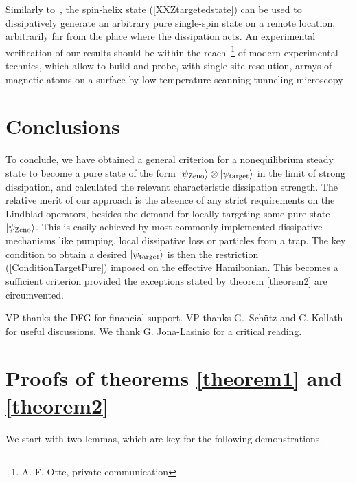 \documentclass[aps,pra,letterpaper,twocolumn,showpacs,superscriptaddress,floatfix,longbibliography]{revtex4-1}
\begin{document}
Similarly to~\cite{2016ZnidarichTargeting}, the spin-helix state
(\ref{XXZtargetedstate}) can be used to dissipatively generate an
arbitrary pure single-spin state on a remote location, arbitrarily far
from the place where the dissipation acts.  An experimental
verification of our results should be within the
reach~\footnote{A. F. Otte, private communication} of modern
experimental technics, which allow to build and probe, with
single-site resolution, arrays of magnetic atoms on a surface by
low-temperature scanning tunneling microscopy~\cite{2016OtteXXZ}.

\section{Conclusions}
To conclude, we have obtained a general criterion for a nonequilibrium
steady state to become a pure state of the form
$|{\psi_\mathrm{Zeno}}\rangle\otimes|{\psi_\mathrm{target}}\rangle$ in the
limit of strong dissipation, and calculated the relevant
characteristic dissipation strength.  The relative merit of our
approach is the absence of any strict requirements on the Lindblad
operators, besides the demand for locally targeting some pure state
$|{\psi_\mathrm{Zeno}}\rangle$. This is easily achieved by most commonly
implemented dissipative mechanisms like pumping, local dissipative
loss or particles from a trap. The key condition to obtain a desired
$|{\psi_\mathrm{target}}\rangle$ is then the restriction
(\ref{ConditionTargetPure}) imposed on the effective Hamiltonian. This
becomes a sufficient criterion provided the exceptions stated by
theorem \ref{theorem2} are circumvented.



\begin{acknowledgments}
  VP thanks the DFG for financial support. VP thanks G.~Sch\"utz and
  C. Kollath for useful discussions. We thank G. Jona-Lasinio for a
  critical reading.
\end{acknowledgments}


\appendix


\section{Proofs of theorems \ref{theorem1} and \ref{theorem2}}
\label{SuppMat}
We start with two lemmas, which are key for the following
demonstrations.
\end{document}
